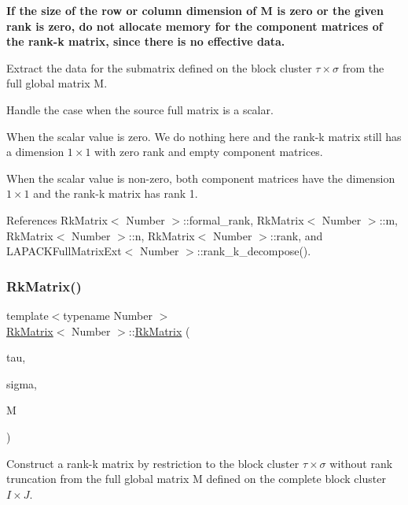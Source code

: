 {\bfseries If the size of the row or column dimension of {\ttfamily M} is zero or the given rank is zero, do not allocate memory for the component matrices of the rank-\/k matrix, since there is no effective data.}

Extract the data for the submatrix defined on the block cluster $\tau \times \sigma$ from the full global matrix {\ttfamily M}.

Handle the case when the source full matrix is a scalar.

When the scalar value is zero. We do nothing here and the rank-\/k matrix still has a dimension $1 \times 1$ with zero rank and empty component matrices.

When the scalar value is non-\/zero, both component matrices have the dimension $1 \times 1$ and the rank-\/k matrix has rank 1.

References Rk\+Matrix$<$ Number $>$\+::formal\+\_\+rank, Rk\+Matrix$<$ Number $>$\+::m, Rk\+Matrix$<$ Number $>$\+::n, Rk\+Matrix$<$ Number $>$\+::rank, and L\+A\+P\+A\+C\+K\+Full\+Matrix\+Ext$<$ Number $>$\+::rank\+\_\+k\+\_\+decompose().

\mbox{\label{classRkMatrix_a4cfccf769e03141b5221c1356bd718a1}} 
\subsubsection{\texorpdfstring{Rk\+Matrix()}{RkMatrix()}\hspace{0.1cm}{\footnotesize\ttfamily [6/18]}}
{\footnotesize\ttfamily template$<$typename Number $>$ \\
\hyperlink{classRkMatrix}{Rk\+Matrix}$<$ Number $>$\+::\hyperlink{classRkMatrix}{Rk\+Matrix} (\begin{DoxyParamCaption}\item[{const std\+::vector$<$ types\+::global\+\_\+dof\+\_\+index $>$ \&}]{tau,  }\item[{const std\+::vector$<$ types\+::global\+\_\+dof\+\_\+index $>$ \&}]{sigma,  }\item[{const \hyperlink{classLAPACKFullMatrixExt}{L\+A\+P\+A\+C\+K\+Full\+Matrix\+Ext}$<$ Number $>$ \&}]{M }\end{DoxyParamCaption})}

Construct a rank-\/k matrix by restriction to the block cluster $\tau \times \sigma$ without rank truncation from the full global matrix {\ttfamily M} defined on the complete block cluster $I \times J$.


